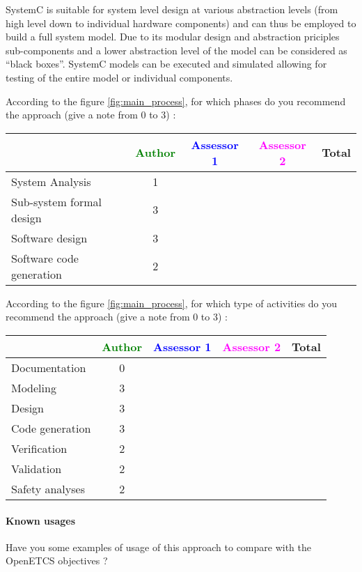 SystemC is suitable for system level design at various abstraction levels (from high level down to individual hardware components) and can thus be employed to build a full system model. Due to its modular design and abstraction priciples sub-components and a lower abstraction level of the model can be considered as ``black boxes''. SystemC models can be executed and simulated allowing for testing of the entire model or individual components.

According to the figure \ref{fig:main_process}, for which phases do you recommend the approach (give a note from 0 to 3) :

\begin{tabular}{|l | c | c | c | c|}
\hline
& \textcolor{green}{Author} & \textcolor{blue}{Assessor 1} & \textcolor{magenta}{Assessor 2} & Total \\
\hline
System Analysis &1 & & & \\
\hline
Sub-system formal design &3 & & & \\
\hline
Software design &3 & & & \\
\hline
Software code generation &2 & & & \\
\hline
\end{tabular}

According to the figure \ref{fig:main_process}, for which type of activities do you recommend the approach (give a note from 0 to 3) :

\begin{tabular}{|l | c | c | c | c|}
\hline
& \textcolor{green}{Author} & \textcolor{blue}{Assessor 1} & \textcolor{magenta}{Assessor 2} & Total \\
\hline
Documentation &0 & & & \\
\hline
Modeling &3 & & & \\
\hline
Design &3 & & & \\
\hline
Code generation &3 & & & \\
\hline
Verification &2 & & & \\
\hline
Validation &2 & & & \\
\hline
Safety analyses &2 & & & \\
\hline
\end{tabular}

\paragraph{Known usages} Have you some examples of usage of this approach to compare with the OpenETCS objectives ?

